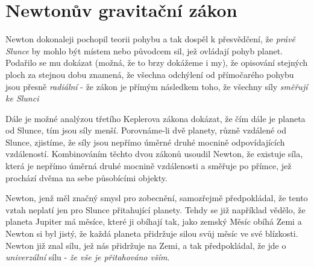 {  \section{Newtonův gravitační zákon}
    Newton dokonaleji pochopil teorii pohybu a tak dospěl k přesvědčení, že \emph{právě Slunce} by 
    mohlo být místem nebo původcem sil, jež ovládají pohyb planet. Podařilo se mu dokázat (možná, 
    že to brzy dokážeme i my), že opisování stejných ploch za stejnou dobu znamená, že všechna 
    odchýlení od přímočarého pohybu jsou přesně \emph{radiální} - že zákon je přímým následkem 
    toho, že všechny síly \emph{směřují ke Slunci}
    
    Dále je možné analýzou třetího Keplerova zákona dokázat, že čím dále je planeta od Slunce, tím 
    jsou síly menší. Porovnáme-li dvě planety, různě vzdálené od Slunce, zjistíme, že síly jsou 
    nepřímo úměrné druhé mocnině odpovídajících vzdáleností. Kombinováním těchto dvou zákonů 
    usoudil Newton, že existuje síla, která je nepřímo úměrná druhé mocnině vzdálenosti a směřuje 
    po přímce, jež prochází dvěma na sebe působícími objekty.
    
    Newton, jenž měl značný smysl pro zobecnění, samozřejmě předpokládal, že tento vztah neplatí 
    jen pro Slunce přitahující planety. Tehdy se již například vědělo, že planeta Jupiter má 
    měsíce, které ji obíhají tak, jako zemský Měsíc obíhá Zemi a Newton si byl jistý, že každá 
    planeta přidržuje silou svůj měsíc ve své blízkosti. Newton již znal sílu, jež nás přidržuje na 
    Zemi, a tak předpokládal, že jde o \emph{univerzální} sílu - \emph{že vše je přitahováno vším}.
    
}
